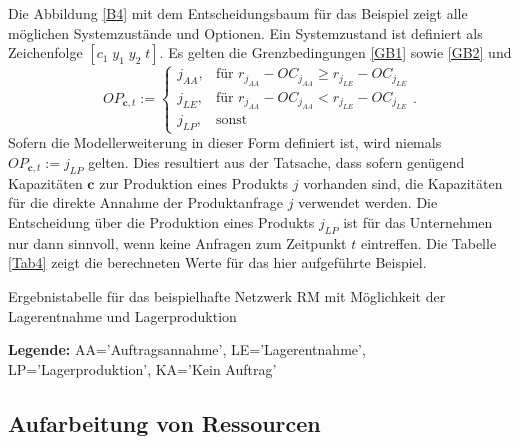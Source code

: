 Die Abbildung \ref{B4} mit dem Entscheidungsbaum für das Beispiel zeigt alle möglichen Systemzustände und Optionen. Ein Systemzustand ist definiert als Zeichenfolge $[c_{1}\; y_{1}\; y_{2}\;t]$. Es gelten die Grenzbedingungen \eqref{GB1} sowie \eqref{GB2} und
\begin{equation}\label{GB4}
     OP_{\textbf{c}, t}:=\left\{\begin{array}{lll} j_{AA}, & \text{für } r_{j_{AA}} - OC_{j_{AA}} \ge r_{j_{LE}} - OC_{j_{LE}}\\
         j_{LE}, & \text{für } r_{j_{AA}} - OC_{j_{AA}} < r_{j_{LE}} - OC_{j_{LE}}\\
         j_{LP}, & \text{sonst}\end{array}\right. .
\end{equation}
Sofern die Modellerweiterung in dieser Form definiert ist, wird niemals $OP_{\textbf{c}, t}:=j_{LP}$ gelten. Dies resultiert aus der Tatsache, dass sofern genügend Kapazitäten $\textbf{c}$ zur Produktion eines Produkts $j$ vorhanden sind, die Kapazitäten für die direkte Annahme der Produktanfrage $j$ verwendet werden. Die Entscheidung über die Produktion eines Produkts $j_{LP}$ ist für das Unternehmen nur dann sinnvoll, wenn keine Anfragen zum Zeitpunkt $t$ eintreffen. Die Tabelle \ref{Tab4} zeigt die berechneten Werte für das hier aufgeführte Beispiel.
\begin{table}
\begin{footnotesize}
    \caption{Ergebnistabelle für das beispielhafte Netzwerk RM mit Möglichkeit der Lagerentnahme und Lagerproduktion} \label{Tab4}
    \vspace*{3mm}
\begin{center}
      {\footnotesize \textbf{Legende:} AA='Auftragsannahme', LE='Lagerentnahme', LP='Lagerproduktion', KA='Kein Auftrag'} 
      \end{center}
\end{footnotesize}
\end{table}

\subsection{Aufarbeitung von Ressourcen}

